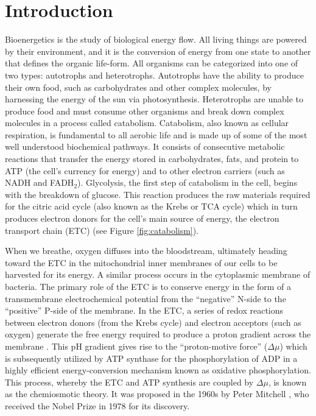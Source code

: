 \chapter{Introduction}

Bioenergetics is the study of biological energy flow. All living things are powered by their environment, and it is the conversion of energy from one state to another that defines the organic life-form. All organisms can be categorized into one of two types: autotrophs and heterotrophs. Autotrophs have the ability to produce their own food, such as carbohydrates and other complex molecules, by harnessing the energy of the sun via photosynthesis. Heterotrophs are unable to produce food and must consume other organisms and break down complex molecules in a process called catabolism. Catabolism, also known as cellular respiration, is fundamental to all aerobic life and is made up of some of the most well understood biochemical pathways. It consists of consecutive metabolic reactions that transfer the energy stored in carbohydrates, fats, and protein to ATP (the cell's currency for energy) and to other electron carriers (such as NADH and FADH$_{2}$). Glycolysis, the first step of catabolism in the cell, begins with the breakdown of glucose. This reaction produces the raw materials required for the citric acid cycle (also known as the Krebs or TCA cycle) which in turn produces electron donors for the cell's main source of energy, the electron transport chain (ETC) (see Figure \ref{fig:catabolism}).

When we breathe, oxygen diffuses into the bloodstream, ultimately heading toward the ETC in the mitochondrial inner membranes of our cells to be harvested for its energy. A similar process occurs in the cytoplasmic membrane of bacteria. The primary role of the ETC is to conserve energy in the form of a transmembrane electrochemical potential from the ``negative'' N-side to the ``positive'' P-side of the membrane. In the ETC, a series of redox reactions between electron donors (from the Krebs cycle) and electron acceptors (such as oxygen) generate the free energy required to produce a proton gradient across the membrane \cite{Papa:1976p9824}. This pH gradient gives rise to the ``proton-motive force'' ($\Delta \mu$) which is subsequently utilized by ATP synthase for the phosphorylation of ADP in a highly efficient energy-conversion mechanism known as oxidative phosphorylation. This process, whereby the ETC and ATP synthesis are coupled by $\Delta \mu$, is known as the chemiosmotic theory. It was proposed in the 1960s by Peter Mitchell \cite{Mitchell:1966p10492}, who received the Nobel Prize in 1978 for its discovery.

